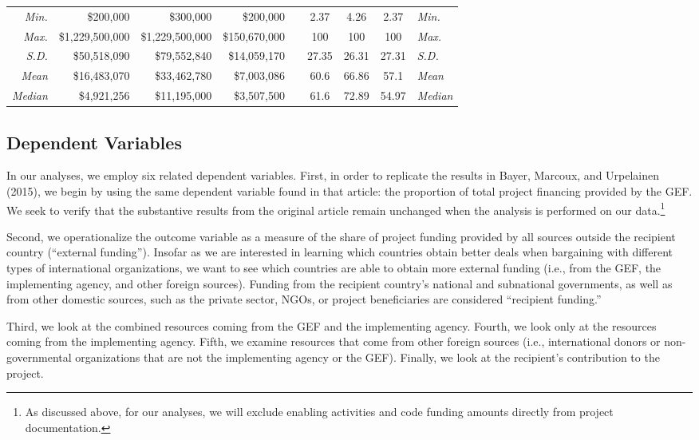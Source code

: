 \documentclass{article}
\begin{document}
\begin{singlespace}
\begin{table}[H]
{\begin{tabular}{rrrrlcccl}
		\textit{Min.} & \$200,000 & \$300,000 & \$200,000 &  & 2.37 & 4.26 & 2.37 & \textit{Min.} \\
		\textit{Max.} & \$1,229,500,000 & \$1,229,500,000 & \$150,670,000 &  & 100 & 100 & 100 & \textit{Max.} \\
		\textit{S.D.} & \$50,518,090 & \$79,552,840 & \$14,059,170 &  & 27.35 & 26.31 & 27.31 & \textit{S.D.} \\
		\textit{Mean} & \$16,483,070 & \$33,462,780 & \$7,003,086 &  & 60.6 & 66.86 & 57.1 & \textit{Mean} \\
		\textit{Median} & \$4,921,256 & \$11,195,000 & \$3,507,500 &  & 61.6 & 72.89 & 54.97 & \textit{Median} \\ \hline
	\end{tabular}%
	}
\end{table}
\end{singlespace}

\subsection{Dependent Variables}
In our analyses, we employ six related dependent variables.  First, in order to replicate the results in Bayer, Marcoux, and Urpelainen (2015), we begin by using the same dependent variable found in that article: the proportion of total project financing provided by the GEF.  We seek to verify that the substantive results from the original article remain unchanged when the analysis is performed on our data.\footnote{As discussed above, for our analyses, we will exclude enabling activities and code funding amounts directly from project documentation.}
   
Second, we operationalize the outcome variable as a measure of the share of project funding provided by all sources outside the recipient country (“external funding”).  Insofar as we are interested in learning which countries obtain better deals when bargaining with different types of international organizations, we want to see which countries are able to obtain more external funding (i.e., from the GEF, the implementing agency, and other foreign sources).  Funding from the recipient country’s national and subnational governments, as well as from other domestic sources, such as the private sector, NGOs, or project beneficiaries are considered “recipient funding.”  

Third, we look at the combined resources coming from the GEF and the implementing agency.  Fourth, we look only at the resources coming from the implementing agency.  Fifth, we examine resources that come from other foreign sources (i.e., international donors or non-governmental organizations that are not the implementing agency or the GEF).  Finally, we look at the recipient’s contribution to the project.
\end{document}
